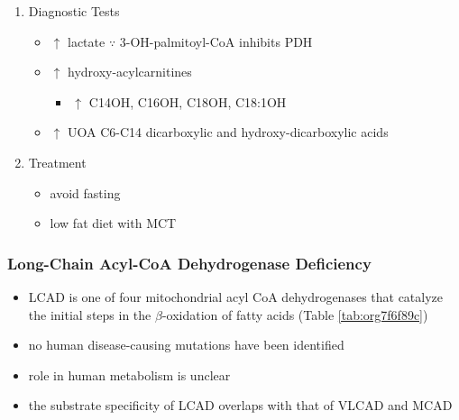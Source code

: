 \documentclass[12pt]{scrartcl}
\begin{document}
\begin{enumerate}
\item Diagnostic Tests
\label{sec:org2973288}
\begin{itemize}
\item \(\uparrow\) lactate \(\because\) 3-OH-palmitoyl-CoA inhibits PDH
\item \(\uparrow\) hydroxy-acylcarnitines
\begin{itemize}
\item \(\uparrow\) C14OH, C16OH, C18OH, C18:1OH
\end{itemize}
\item \(\uparrow\) UOA C6-C14 dicarboxylic and hydroxy-dicarboxylic acids
\end{itemize}

\item Treatment
\label{sec:orgf96b772}
\begin{itemize}
\item avoid fasting
\item low fat diet with MCT
\end{itemize}
\end{enumerate}
\subsubsection{Long-Chain Acyl-CoA Dehydrogenase Deficiency}
\label{sec:org42017ba}
\begin{itemize}
\item LCAD is one of four mitochondrial acyl CoA dehydrogenases that
catalyze the initial steps in the \(\beta\)-oxidation of fatty acids
(Table \ref{tab:org7f6f89c})
\item no human disease-causing mutations have been identified
\item role  in  human  metabolism  is unclear
\item the substrate specificity of LCAD overlaps with that of
VLCAD and MCAD
\end{itemize}
\end{document}

